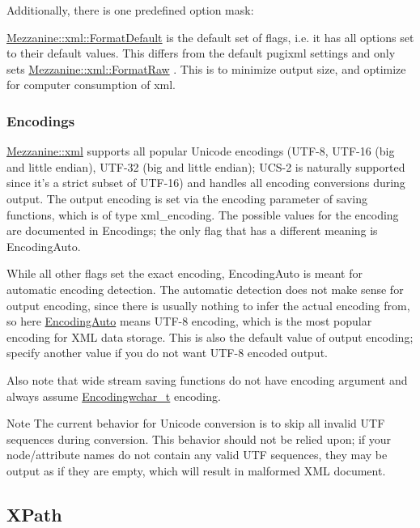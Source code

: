 Additionally, there is one predefined option mask:
\begin{DoxyItemize}
\item \hyperlink{namespaceMezzanine_1_1xml_ad6b5ebd9ea7799aba19391495e2b09e5}{Mezzanine::xml::FormatDefault} is the default set of flags, i.e. it has all options set to their default values. This differs from the default pugixml settings and only sets \hyperlink{namespaceMezzanine_1_1xml_a92396af17ca2c698180d7394362b9a70}{Mezzanine::xml::FormatRaw} . This is to minimize output size, and optimize for computer consumption of xml.
\end{DoxyItemize}\hypertarget{XMLManual_XMLSavingEncodings}{}\subsubsection{Encodings}\label{XMLManual_XMLSavingEncodings}
\hyperlink{namespaceMezzanine_1_1xml}{Mezzanine::xml} supports all popular Unicode encodings (UTF-\/8, UTF-\/16 (big and little endian), UTF-\/32 (big and little endian); UCS-\/2 is naturally supported since it's a strict subset of UTF-\/16) and handles all encoding conversions during output. The output encoding is set via the encoding parameter of saving functions, which is of type xml\_\-encoding. The possible values for the encoding are documented in Encodings; the only flag that has a different meaning is EncodingAuto. \par
 \par
 While all other flags set the exact encoding, EncodingAuto is meant for automatic encoding detection. The automatic detection does not make sense for output encoding, since there is usually nothing to infer the actual encoding from, so here \hyperlink{namespaceMezzanine_1_1xml_ab1e7e96991b9c08ac13e797a15253804}{EncodingAuto} means UTF-\/8 encoding, which is the most popular encoding for XML data storage. This is also the default value of output encoding; specify another value if you do not want UTF-\/8 encoded output. \par
 \par
 Also note that wide stream saving functions do not have encoding argument and always assume \hyperlink{namespaceMezzanine_1_1xml_ab1e7e96991b9c08ac13e797a15253804}{Encodingwchar\_\-t} encoding. \begin{DoxyNote}{Note}
The current behavior for Unicode conversion is to skip all invalid UTF sequences during conversion. This behavior should not be relied upon; if your node/attribute names do not contain any valid UTF sequences, they may be output as if they are empty, which will result in malformed XML document. 
\end{DoxyNote}
\hypertarget{XMLManual_XMLXPath}{}\subsection{XPath}\label{XMLManual_XMLXPath}

